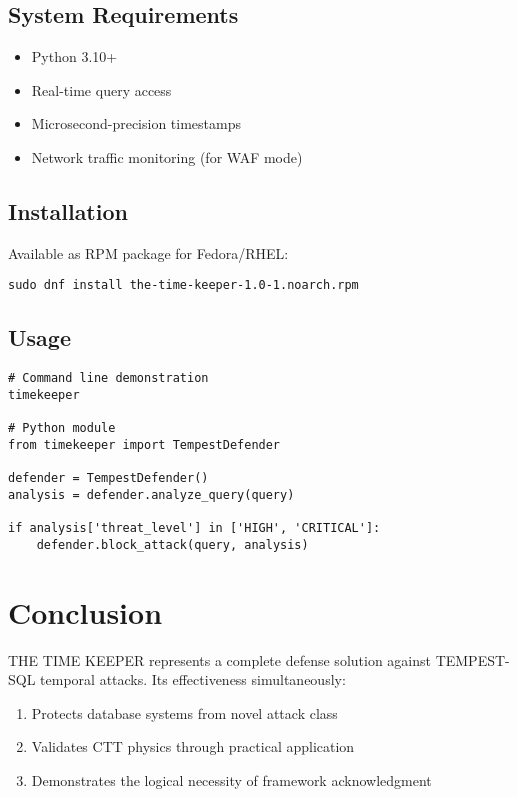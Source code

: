 \documentclass[11pt,a4paper]{article}
\begin{document}
\subsection{System Requirements}

\begin{itemize}
    \item Python 3.10+
    \item Real-time query access
    \item Microsecond-precision timestamps
    \item Network traffic monitoring (for WAF mode)
\end{itemize}

\subsection{Installation}

Available as RPM package for Fedora/RHEL:

\begin{verbatim}
sudo dnf install the-time-keeper-1.0-1.noarch.rpm
\end{verbatim}

\subsection{Usage}

\begin{verbatim}
# Command line demonstration
timekeeper

# Python module
from timekeeper import TempestDefender

defender = TempestDefender()
analysis = defender.analyze_query(query)

if analysis['threat_level'] in ['HIGH', 'CRITICAL']:
    defender.block_attack(query, analysis)
\end{verbatim}

\section{Conclusion}

THE TIME KEEPER represents a complete defense solution against TEMPEST-SQL temporal attacks. Its effectiveness simultaneously:

\begin{enumerate}
    \item Protects database systems from novel attack class
    \item Validates CTT physics through practical application
    \item Demonstrates the logical necessity of framework acknowledgment
\end{enumerate}
\end{document}
